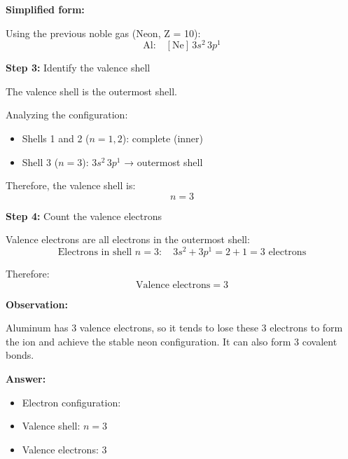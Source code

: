 \begin{exercise}
\begin{solu}
        \textbf{Simplified form:}

        Using the previous noble gas (Neon, Z = 10):
        \[
            \text{Al:} \quad [\text{Ne}] \, 3s^2 \, 3p^1
        \]

        \textbf{Step 3:} Identify the valence shell

        The valence shell is the outermost shell.

        Analyzing the configuration:
        \begin{itemize}
            \item Shells 1 and 2 (\(n = 1, 2\)): complete (inner)
            \item Shell 3 (\(n = 3\)): \(3s^2 \, 3p^1\) → outermost shell
        \end{itemize}

        Therefore, the valence shell is:
        \[
            \boxed{n = 3}
        \]

        \textbf{Step 4:} Count the valence electrons

        Valence electrons are all electrons in the outermost shell:
        \[
            \text{Electrons in shell } n = 3: \quad 3s^2 + 3p^1 = 2 + 1 = 3 \text{ electrons}
        \]

        Therefore:
        \[
            \boxed{\text{Valence electrons} = 3}
        \]

        \textbf{Observation:}

        Aluminum has 3 valence electrons, so it tends to lose these 3 electrons to form the  ion and achieve the stable neon configuration. It can also form 3 covalent bonds.

        \textbf{Answer:}
        \begin{itemize}
            \item Electron configuration: 
            \item Valence shell: \(n = 3\)
            \item Valence electrons: 3
        \end{itemize}
    \end{solu}
\end{exercise}
